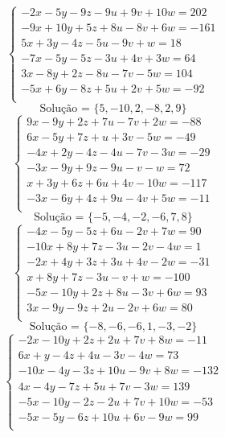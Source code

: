 \documentclass[12pt,oneside,a4paper]{article}
\begin{document}
\vspace{\baselineskip}
\begin{equation*}
\begin{cases}
-2x-5y-9z-9u+9v+10w=202 \\
-9x+10y+5z+8u-8v+6w=-161 \\
5x+3y-4z-5u-9v+w=18 \\
-7x-5y-5z-3u+4v+3w=64 \\
3x-8y+2z-8u-7v-5w=104 \\
-5x+6y-8z+5u+2v+5w=-92 \\
\end{cases}
\end{equation*}
\begin{equation*}
\text{Solução = }\{5,-10,2,-8,2,9\}
\end{equation*}
\vspace{\baselineskip}
\begin{equation*}
\begin{cases}
9x-9y+2z+7u-7v+2w=-88 \\
6x-5y+7z+u+3v-5w=-49 \\
-4x+2y-4z-4u-7v-3w=-29 \\
-3x-9y+9z-9u-v-w=72 \\
x+3y+6z+6u+4v-10w=-117 \\
-3x-6y+4z+9u-4v+5w=-11 \\
\end{cases}
\end{equation*}
\begin{equation*}
\text{Solução = }\{-5,-4,-2,-6,7,8\}
\end{equation*}
\vspace{\baselineskip}
\begin{equation*}
\begin{cases}
-4x-5y-5z+6u-2v+7w=90 \\
-10x+8y+7z-3u-2v-4w=1 \\
-2x+4y+3z+3u+4v-2w=-31 \\
x+8y+7z-3u-v+w=-100 \\
-5x-10y+2z+8u-3v+6w=93 \\
3x-9y-9z+2u-2v+6w=80 \\
\end{cases}
\end{equation*}
\begin{equation*}
\text{Solução = }\{-8,-6,-6,1,-3,-2\}
\end{equation*}
\vspace{\baselineskip}
\begin{equation*}
\begin{cases}
-2x-10y+2z+2u+7v+8w=-11 \\
6x+y-4z+4u-3v-4w=73 \\
-10x-4y-3z+10u-9v+8w=-132 \\
4x-4y-7z+5u+7v-3w=139 \\
-5x-10y-2z-2u+7v+10w=-53 \\
-5x-5y-6z+10u+6v-9w=99 \\
\end{cases}
\end{equation*}
\end{document}
